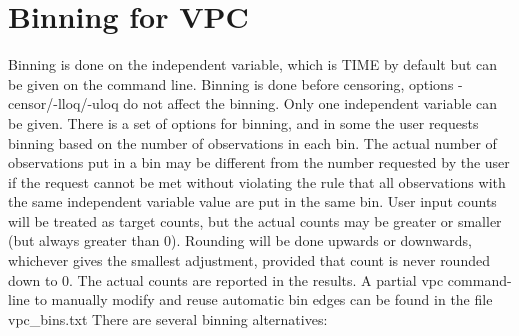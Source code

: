 \section{Binning for VPC}
Binning is done on the independent variable, which is TIME by default but can be given on the command line. Binning is done before censoring, options -censor/-lloq/-uloq do not affect the binning. Only one independent variable can be given. There is a set of options for binning, and in some the user requests binning based on the number of observations in each bin. The actual number of observations put in a bin may be different from the number requested by the user if the request cannot be met without violating the rule that all observations with the same independent variable value are put in the same bin. User input counts will be treated as target counts, but the actual counts may be greater or smaller (but always greater than 0). Rounding will be done upwards or downwards, whichever gives the smallest adjustment, provided that count is never rounded down to 0. The actual counts are reported in the results. A partial vpc command-line to manually modify and reuse automatic bin edges can be found in the file vpc\_bins.txt
There are several binning alternatives:
